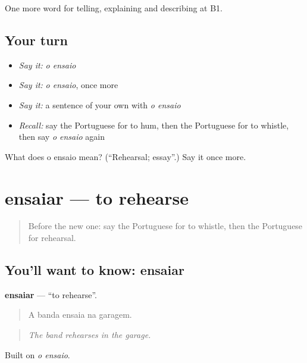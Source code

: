 \begin{grammarlens}[title={What you've built}]
One more word for telling, explaining and describing at B1.
\end{grammarlens}

\subsection*{Your turn}
\begin{itemize}
\raggedright
  \item \emph{Say it:} \emph{o ensaio}
  \item \emph{Say it:} \emph{o ensaio}, once more
  \item \emph{Say it:} a sentence of your own with \emph{o ensaio}
  \item \emph{Recall:} say the Portuguese for to hum, then the Portuguese for to whistle, then say \emph{o ensaio} again
\end{itemize}

\begin{tcolorbox}[breakable,colback=teal!4,colframe=teal!35!black,title={Before you move on}]
What does o ensaio mean? (\textquotedblleft{}Rehearsal; essay\textquotedblright{}.) Say it once more.
\end{tcolorbox}
\section[ensaiar]{ensaiar — to rehearse}

\label{lesson:PT-C519-ensaiar}



\begin{quote}
Before the new one: say the Portuguese for to whistle, then the Portuguese for rehearsal.
\end{quote}

\subsection*{You'll want to know: ensaiar}
\textbf{ensaiar} — \textquotedblleft{}to rehearse\textquotedblright{}.

\begin{quote}
A banda ensaia na garagem.
\end{quote}

\begin{quote}
\emph{The band rehearses in the garage.}
\end{quote}

Built on \emph{o ensaio}.

